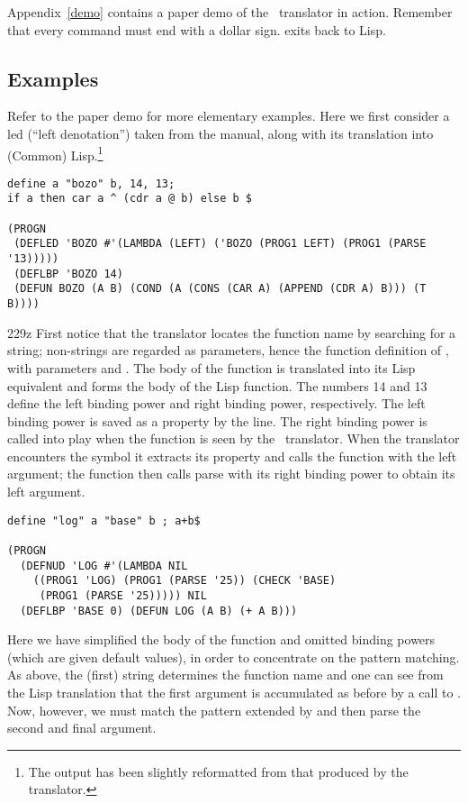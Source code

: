 Appendix~\ref{demo} contains a paper demo of the \cgol\ translator in action.
Remember that every command must end with a dollar sign.  
exits back to Lisp.

\subsection{Examples}

Refer to the paper demo for more elementary examples.  Here we first consider a
led (``left denotation'') taken from the manual, along with its
translation into (Common) Lisp.\footnote{The output has been slightly
reformatted from that produced by the translator.}

{\footnotesize\begin{verbatim}
define a "bozo" b, 14, 13;
if a then car a ^ (cdr a @ b) else b $

(PROGN 
 (DEFLED 'BOZO #'(LAMBDA (LEFT) ('BOZO (PROG1 LEFT) (PROG1 (PARSE '13)))))
 (DEFLBP 'BOZO 14)
 (DEFUN BOZO (A B) (COND (A (CONS (CAR A) (APPEND (CDR A) B))) (T B)))) 
\end{verbatim}}
229z
First notice that the translator locates the function name by searching for
a string; non-strings are regarded as parameters, hence the function
definition of , with parameters  and .  The body
of the function is translated into its Lisp equivalent and forms the body
of the Lisp function.  The numbers 14 and 13 define the left binding power
and right binding power, respectively.  The left binding power is saved as
a property by the  line.  The right binding power is called
into play when the function is seen by the \cgol\ translator.  When the
translator encounters the symbol  it extracts its 
property and calls the function with the left argument; the function then
calls parse with its right binding power to obtain its left argument.


{\footnotesize\begin{verbatim}
define "log" a "base" b ; a+b$

(PROGN
  (DEFNUD 'LOG #'(LAMBDA NIL
    ((PROG1 'LOG) (PROG1 (PARSE '25)) (CHECK 'BASE)
     (PROG1 (PARSE '25))))) NIL
  (DEFLBP 'BASE 0) (DEFUN LOG (A B) (+ A B))) 
\end{verbatim}}

Here we have simplified the body of the function and omitted binding powers
(which are given default values), in order to concentrate on the pattern
matching.  As above, the (first) string determines the function name and
one can see from the Lisp translation that the first argument is
accumulated as before by a call to .  Now, however, we must
match the pattern extended by  and then parse the second and
final argument.


